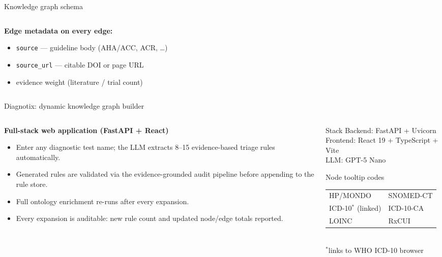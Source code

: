 \documentclass[aspectratio=169]{beamer}
\begin{document}
\begin{frame}{Knowledge graph schema}
\begin{columns}[T]
\begin{column}{0.53\textwidth}
      \vspace{0.8em}
      \textbf{Edge metadata on every edge:}
      \begin{itemize}
        \item \texttt{source} --- guideline body (AHA/ACC, ACR, \ldots)
        \item \texttt{source\_url} --- citable DOI or page URL
        \item evidence weight (literature / trial count)
      \end{itemize}
    \end{column}
  \end{columns}
\end{frame}

\begin{frame}[fragile]{Diagnotix: dynamic knowledge graph builder}
  \begin{columns}[T]
    \begin{column}{0.52\textwidth}
      \textbf{Full-stack web application (FastAPI + React)}

      \begin{itemize}
        \item Enter any diagnostic test name; the LLM extracts
              8--15 evidence-based triage rules automatically.
        \item Generated rules are validated via the
              evidence-grounded audit pipeline before
              appending to the rule store.
        \item Full ontology enrichment re-runs after
              every expansion.
        \item Every expansion is auditable: new rule count
              and updated node/edge totals reported.
      \end{itemize}
    \end{column}
    \begin{column}{0.45\textwidth}
      \begin{block}{Stack}
        \small
        Backend: FastAPI + Uvicorn\\
        Frontend: React 19 + TypeScript + Vite\\
        LLM: GPT-5 Nano
      \end{block}
      \begin{block}{Node tooltip codes}
        \small
        \begin{tabular}{@{}ll@{}}
          HP/MONDO    & SNOMED-CT \\
          ICD-10$^{*}$ (linked) & ICD-10-CA \\
          LOINC       & RxCUI \\
        \end{tabular}\\[2pt]
        \tiny $^{*}$links to WHO ICD-10 browser
      \end{block}
    \end{column}
  \end{columns}
\end{frame}
\end{document}
